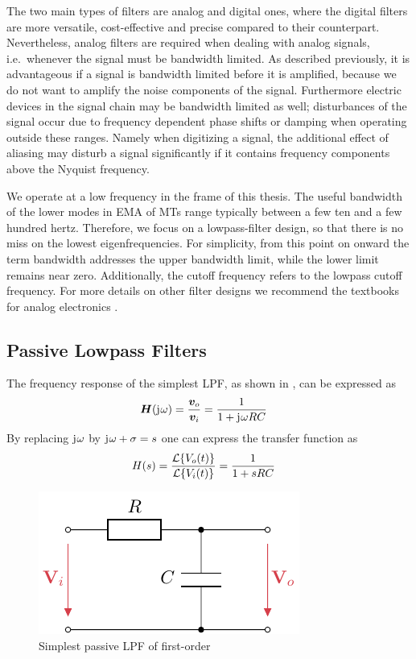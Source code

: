 The two main types of filters are analog and digital ones, where the digital filters are more versatile, cost-effective and precise compared to their counterpart. Nevertheless, analog filters are required when dealing with analog signals, i.e.\ whenever the signal must be bandwidth limited. As described previously, it is advantageous if a signal is bandwidth limited before it is amplified, because we do not want to amplify the noise components of the signal. Furthermore electric devices in the signal chain may be bandwidth limited as well; disturbances of the signal occur due to frequency dependent phase shifts or damping when operating outside these ranges. Namely when digitizing a signal, the additional effect of aliasing may disturb a signal significantly if it contains frequency components above the Nyquist frequency.

We operate at a low frequency in the frame of this thesis. The useful bandwidth of the lower modes in \ac{EMA} of \ac{MT}s range typically between a few ten and a few hundred hertz. Therefore, we focus on a lowpass-filter design, so that there is no miss on the lowest eigenfrequencies. For simplicity, from this point on onward the term bandwidth addresses the upper bandwidth limit, while the lower limit remains near zero. Additionally, the cutoff frequency refers to the lowpass cutoff frequency. For more details on other filter designs we recommend the textbooks for analog electronics \cite{Tietze2008EC, Stiny2019AeB}.

\subsection{Passive Lowpass Filters}
The frequency response of the simplest \ac{LPF}, as shown in , can be expressed as
\begin{align}
  \bm{H}(\mathrm{j}\mkern1mu\omega) &= \frac{\bm{v}_o}{\bm{v}_i} = \frac{1}{1+\mathrm{j}\mkern1mu\omega RC}
\end{align}
By replacing $\mathrm{j}\mkern1mu\omega$ by $\mathrm{j}\mkern1mu\omega+\sigma = s$ one can express the transfer function as
\begin{align}
  H(s) &= \frac{\mathcal{L}\{V_o(t)\}}{\mathcal{L}\{V_i(t)\}} = \frac{1}{1 + sRC}
\end{align}

\begin{figure}[htb!]
  \centering
  \includegraphics[scale=1]{figures/electronics/lowpass/lp_passive_1ord/lp_passive_1ord}
  \caption[Passive first-order \ac{LPF}]{Simplest passive \ac{LPF} of first-order%
    \label{fig:lp_passive_1ord}}
\end{figure}

